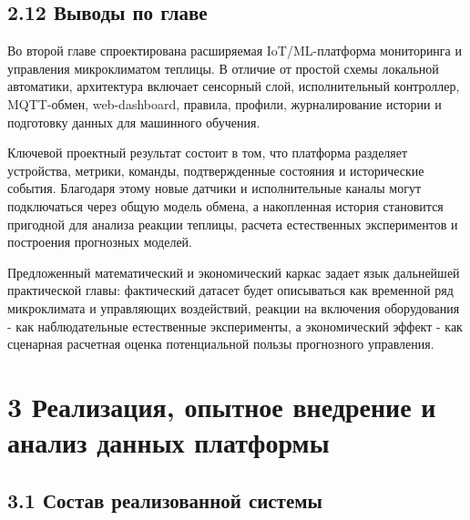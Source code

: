 \documentclass[a4paper,14pt]{extarticle}
\begin{document}
\hypertarget{ux432ux44bux432ux43eux434ux44b-ux43fux43e-ux433ux43bux430ux432ux435}{%
\subsection{2.12 Выводы по
главе}\label{ux432ux44bux432ux43eux434ux44b-ux43fux43e-ux433ux43bux430ux432ux435}}

Во второй главе спроектирована расширяемая IoT/ML-платформа мониторинга
и управления микроклиматом теплицы. В отличие от простой схемы локальной
автоматики, архитектура включает сенсорный слой, исполнительный
контроллер, MQTT-обмен, web-dashboard, правила, профили, журналирование
истории и подготовку данных для машинного обучения.

Ключевой проектный результат состоит в том, что платформа разделяет
устройства, метрики, команды, подтвержденные состояния и исторические
события. Благодаря этому новые датчики и исполнительные каналы могут
подключаться через общую модель обмена, а накопленная история становится
пригодной для анализа реакции теплицы, расчета естественных
экспериментов и построения прогнозных моделей.

Предложенный математический и экономический каркас задает язык
дальнейшей практической главы: фактический датасет будет описываться как
временной ряд микроклимата и управляющих воздействий, реакции на
включения оборудования - как наблюдательные естественные эксперименты, а
экономический эффект - как сценарная расчетная оценка потенциальной
пользы прогнозного управления.

\hypertarget{ux440ux435ux430ux43bux438ux437ux430ux446ux438ux44f-ux43eux43fux44bux442ux43dux43eux435-ux432ux43dux435ux434ux440ux435ux43dux438ux435-ux438-ux430ux43dux430ux43bux438ux437-ux434ux430ux43dux43dux44bux445-ux43fux43bux430ux442ux444ux43eux440ux43cux44b}{%
\section{3 Реализация, опытное внедрение и анализ данных
платформы}\label{ux440ux435ux430ux43bux438ux437ux430ux446ux438ux44f-ux43eux43fux44bux442ux43dux43eux435-ux432ux43dux435ux434ux440ux435ux43dux438ux435-ux438-ux430ux43dux430ux43bux438ux437-ux434ux430ux43dux43dux44bux445-ux43fux43bux430ux442ux444ux43eux440ux43cux44b}}

\hypertarget{ux441ux43eux441ux442ux430ux432-ux440ux435ux430ux43bux438ux437ux43eux432ux430ux43dux43dux43eux439-ux441ux438ux441ux442ux435ux43cux44b}{%
\subsection{3.1 Состав реализованной
системы}\label{ux441ux43eux441ux442ux430ux432-ux440ux435ux430ux43bux438ux437ux43eux432ux430ux43dux43dux43eux439-ux441ux438ux441ux442ux435ux43cux44b}}
\end{document}
